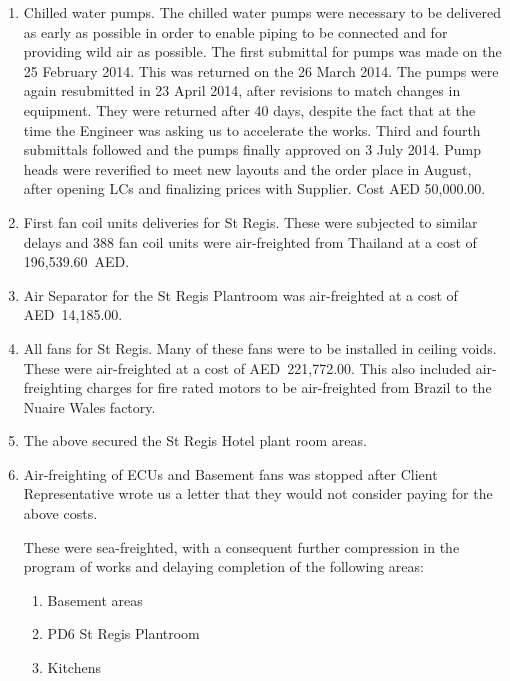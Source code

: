 \begin{enumerate}
\item Chilled water pumps. The chilled water pumps were necessary to be delivered as early as possible in order to enable piping to be connected and for providing wild air as possible. The first submittal for pumps was made on the 25 February 2014. This was returned on the 26 March 2014. The pumps were again resubmitted in 23 April 2014, after revisions to match changes in equipment. They were returned after 40 days, despite the fact that at the time the Engineer was asking us to accelerate the works. Third and fourth submittals followed and the pumps finally approved on 3 July 2014. Pump heads were reverified to meet new layouts and the order place in August, after opening LCs and finalizing prices with Supplier. Cost AED 50,000.00. 

\item First fan coil units deliveries for St Regis. These were subjected to similar delays and 388 fan coil units were air-freighted from Thailand at a cost of 196,539.60~AED. 

\item Air Separator for the St Regis Plantroom was air-freighted at a cost of AED~14,185.00.
\item All fans for St Regis. Many of these fans were to be installed in ceiling voids. These were air-freighted at a cost of AED~221,772.00. This also included air-freighting charges for fire rated motors to be air-freighted from Brazil to the Nuaire Wales factory.

\item The above secured the St Regis Hotel plant room areas.

\item Air-freighting of ECUs and Basement fans was stopped after Client Representative wrote us a letter that they would not consider paying for the above costs.  

These were sea-freighted, with a consequent further compression in the program of works and delaying completion of the following areas:

\begin{enumerate}
\item Basement areas
\item PD6 St Regis Plantroom
\item Kitchens
\end{enumerate}
\end{enumerate}


